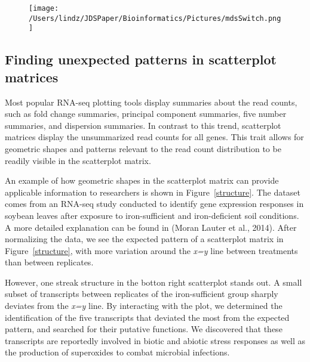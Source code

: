 \documentclass[useAMS,referee]{biom}
\begin{document}
\begin{figure}
\begin{center}
\centerline{}
\end{center}
\caption{
\label{switchedScatMat}}
\end{figure}

\begin{figure}
\begin{center}
\centerline{\texttt{[image: /Users/lindz/JDSPaper/Bioinformatics/Pictures/mdsSwitch.png]}}
\end{center}
\caption{
\label{mdsSwitch}}
\end{figure}

\subsection{Finding unexpected patterns in scatterplot matrices}
\label{s:Finding unexpected patterns in scatterplot matrices}

Most popular RNA-seq plotting tools display summaries about the read counts, such as fold change summaries, principal component summaries, five number summaries, and dispersion summaries. In contrast to this trend, scatterplot matrices display the unsummarized read counts for all genes. This trait allows for geometric shapes and patterns relevant to the read count distribution to be readily visible in the scatterplot matrix.

An example of how geometric shapes in the scatterplot matrix can provide applicable information to researchers is shown in Figure~\ref{structure}. The dataset comes from an RNA-seq study conducted to identify gene expression responses in soybean leaves after exposure to iron-sufficient and iron-deficient soil conditions. A more detailed explanation can be found in (Moran Lauter et al., 2014). After normalizing the data, we see the expected pattern of a scatterplot matrix in Figure~\ref{structure}, with more variation around the \textit{x=y} line between treatments than between replicates. 

However, one streak structure in the botton right scatterplot stands out. A small subset of transcripts between replicates of the iron-sufficient group sharply deviates from the \textit{x=y} line. By interacting with the plot, we determined the identification of the five transcripts that deviated the most from the expected pattern, and searched for their putative functions. We discovered that these transcripts are reportedly involved in biotic and abiotic stress responses as well as the production of superoxides to combat microbial infections.
\end{document}
